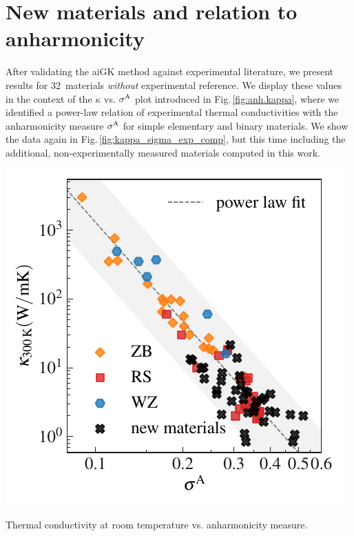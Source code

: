 \section{New materials and relation to anharmonicity}
\label{sec:results.new}
After validating the aiGK method against experimental literature, we present results for 32~materials \emph{without} experimental reference. We display these values in the context of the $\kappa$ vs. $\sigma^\mathrm{A}$ plot introduced in Fig.\,\ref{fig:anh.kappa}, where we identified a power-law relation of experimental thermal conductivities with the anharmonicity measure $\sigma^\mathrm{A}$ for simple elementary and binary materials. We show the data again in Fig.\,\ref{fig:kappa_sigma_exp_comp}, but this time including the additional, non-experimentally measured materials computed in this work.
%
\begin{marginfigure}
	\includegraphics[width=\textwidth]{./data/plots/anharmonicity/9_kappa/incl_computations/sigma_vs_kappa_annot_comp_margin.pdf}
	\caption{Thermal conductivity at room temperature vs. anharmonicity measure.}
	\label{fig:kappa_sigma_exp_comp}
\end{marginfigure}
%
